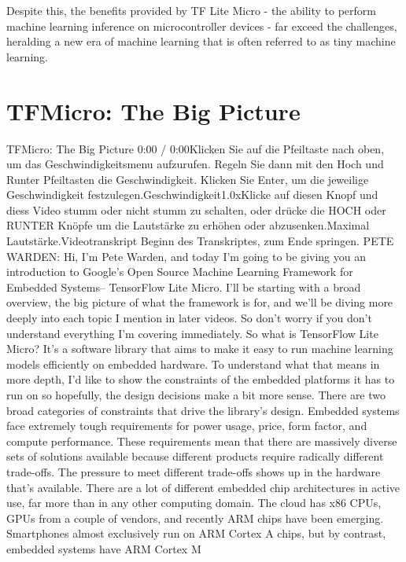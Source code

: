 Despite this, the benefits provided by TF Lite Micro - the ability to perform machine learning inference on microcontroller devices - far exceed the challenges, heralding a new era of machine learning that is often referred to as tiny machine learning.





\section{TFMicro: The Big Picture}

TFMicro: The Big Picture
0:00 / 0:00Klicken Sie auf die Pfeiltaste nach oben, um das Geschwindigkeitsmenu aufzurufen. Regeln Sie dann mit den Hoch und Runter Pfeiltasten die Geschwindigkeit. Klicken Sie Enter, um die jeweilige Geschwindigkeit festzulegen.Geschwindigkeit1.0xKlicke auf diesen Knopf und diess Video stumm oder nicht stumm zu schalten, oder drücke die HOCH oder RUNTER Knöpfe um die Lautstärke zu erhöhen oder abzusenken.Maximal Lautstärke.Videotranskript
Beginn des Transkriptes, zum Ende springen.
PETE WARDEN: Hi, I'm Pete Warden, and today I'm
going to be giving you an introduction to Google's Open Source Machine
Learning Framework for Embedded Systems--
TensorFlow Lite Micro.
I'll be starting with a broad overview, the big picture of what
the framework is for, and we'll be diving more deeply into each topic
I mention in later videos.
So don't worry if you don't understand everything I'm covering immediately.
So what is TensorFlow Lite Micro?
It's a software library that aims to make
it easy to run machine learning models efficiently on embedded hardware.
To understand what that means in more depth,
I'd like to show the constraints of the embedded platforms it
has to run on so hopefully, the design decisions make a bit more sense.
There are two broad categories of constraints
that drive the library's design.
Embedded systems face extremely tough requirements for power usage, price,
form factor, and compute performance.
These requirements mean that there are massively
diverse sets of solutions available because different products require
radically different trade-offs.
The pressure to meet different trade-offs
shows up in the hardware that's available.
There are a lot of different embedded chip architectures in active use,
far more than in any other computing domain.
The cloud has x86 CPUs, GPUs from a couple of vendors,
and recently ARM chips have been emerging.
Smartphones almost exclusively run on ARM Cortex
A chips, but by contrast, embedded systems have ARM Cortex M
